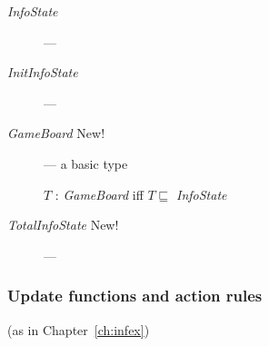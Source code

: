 \begin{description}
\item[\textnormal{\textit{InfoState}}] --- 
  
\item[\textnormal{\textit{InitInfoState}}] ---   

  
\item[\textnormal{\textit{GameBoard}} New!] --- a basic type

  $T$ : \textit{GameBoard} iff $T\sqsubseteq$ \textit{InfoState}
  
\item[\textnormal{\textit{TotalInfoState}} New!] --- 


\end{description}

\subsubsection{Update functions and action rules}

(as in Chapter~\ref{ch:infex})

  
